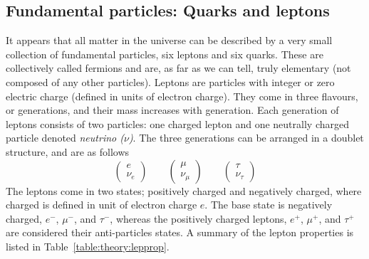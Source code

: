 \subsection{Fundamental particles: Quarks and leptons}
It appears that all matter in the universe can be described by a very small collection of fundamental particles, six leptons and six quarks. These are collectively called fermions and are, as far as we can tell, truly elementary (not composed of any other particles).
Leptons are particles with integer or zero electric charge (defined in units of electron charge). They come in three flavours, or generations, and their mass increases with generation. Each generation of leptons consists of two particles: one charged lepton and one neutrally charged particle denoted \emph{neutrino ($\nu$)}. The three generations can be arranged in a doublet structure, and are as follows
\begin{equation}
\label{eqn:lepton_flavor_doublets}
\begin{pmatrix} e       \\ \nu_e      \end{pmatrix} \qquad
\begin{pmatrix} \mu     \\ \nu_{\mu}  \end{pmatrix} \qquad
\begin{pmatrix} \tau    \\ \nu_{\tau} \end{pmatrix}
\end{equation}
The leptons come in two states; positively charged and negatively charged, where charged is defined in unit of electron charge $e$. The base state is negatively charged, $e^{-}$, $\mu^{-}$, and $\tau^{-}$,  whereas the positively charged leptons,  $e^{+}$, $\mu^{+}$, and $\tau^{+}$ are considered their anti-particles states.
A summary of the lepton properties is listed in Table~\ref{table:theory:lepprop}.
